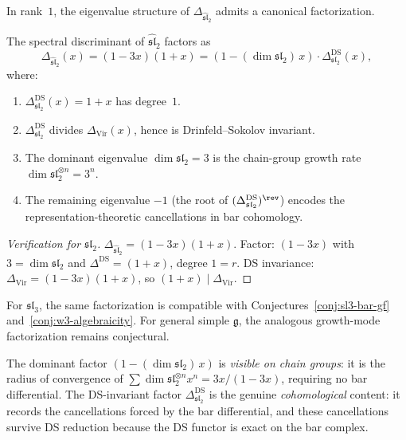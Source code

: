 In rank~\(1\), the eigenvalue structure of
\(\Delta_{\widehat{\mathfrak{sl}}_2}\) admits a canonical
factorization.

\begin{theorem}
\label{thm:growth-mode-factorization}
The spectral discriminant of \(\widehat{\mathfrak{sl}}_2\) factors as
\begin{equation}\label{eq:growth-mode-factor}
\Delta_{\widehat{\mathfrak{sl}}_2}(x)
=(1-3x)(1+x)
=(1-(\dim\mathfrak{sl}_2)\,x)\cdot
\Delta^{\mathrm{DS}}_{\mathfrak{sl}_2}(x),
\end{equation}
where:
\begin{enumerate}[label=\textup{(\roman*)}]
\item
\(\Delta^{\mathrm{DS}}_{\mathfrak{sl}_2}(x)=1+x\) has degree~\(1\).
\item
\(\Delta^{\mathrm{DS}}_{\mathfrak{sl}_2}\) divides
\(\Delta_{\mathrm{Vir}}(x)\), hence is
Drinfeld--Sokolov invariant.
\item
The dominant eigenvalue \(\dim\mathfrak{sl}_2=3\) is the
chain-group growth rate
\(\dim\mathfrak{sl}_2^{\otimes n}=3^n\).
\item
The remaining eigenvalue \(-1\)
\textup{(}the root of
\((\Delta^{\mathrm{DS}}_{\mathfrak{sl}_2})^{\rev}\)\textup{)}
encodes the
representation-theoretic cancellations in bar cohomology.
\end{enumerate}
\end{theorem}

\begin{proof}[Verification for \(\mathfrak{sl}_2\)]
\(\Delta_{\widehat{\mathfrak{sl}}_2}=(1{-}3x)(1{+}x)\).
Factor: \((1{-}3x)\) with \(3=\dim\mathfrak{sl}_2\) and
\(\Delta^{\mathrm{DS}}=(1{+}x)\), degree \(1=r\).
DS invariance: \(\Delta_{\mathrm{Vir}}=(1{-}3x)(1{+}x)\),
so \((1{+}x)\mid\Delta_{\mathrm{Vir}}\).
\end{proof}

\begin{remark}
For \(\mathfrak{sl}_3\), the same factorization is compatible with
Conjectures~\ref{conj:sl3-bar-gf} and~\ref{conj:w3-algebraicity}.  For
general simple \(\mathfrak g\), the analogous growth-mode
factorization remains conjectural.
\end{remark}

\begin{remark}
The dominant factor \((1-(\dim\mathfrak{sl}_2)\,x)\) is
\emph{visible on chain groups}: it is the radius of
convergence of
\(\sum\dim\mathfrak{sl}_2^{\otimes n}x^n
=3x/(1{-}3x)\),
requiring no bar differential.
The DS-invariant factor \(\Delta^{\mathrm{DS}}_{\mathfrak{sl}_2}\) is the
genuine \emph{cohomological} content: it records the
cancellations forced by the bar differential, and these
cancellations survive DS reduction because the DS functor
is exact on the bar complex.
\end{remark}

